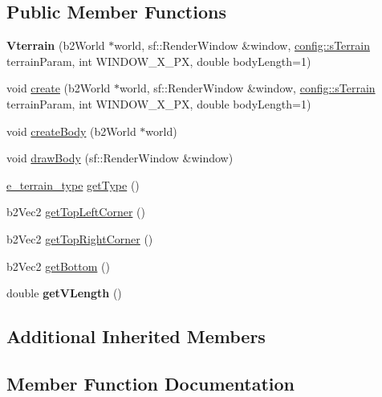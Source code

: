 \subsection*{Public Member Functions}
\begin{DoxyCompactItemize}
\item 
\mbox{\label{class_vterrain_aeb026f16403751d73dd640bec2705c39}} 
{\bfseries Vterrain} (b2\+World $\ast$world, sf\+::\+Render\+Window \&window, \mbox{\hyperlink{structconfig_1_1s_terrain}{config\+::s\+Terrain}} terrain\+Param, int W\+I\+N\+D\+O\+W\+\_\+\+X\+\_\+\+PX, double body\+Length=1)
\item 
void \mbox{\hyperlink{class_vterrain_a480ed9dbd18d1806fa68f44857f3cf99}{create}} (b2\+World $\ast$world, sf\+::\+Render\+Window \&window, \mbox{\hyperlink{structconfig_1_1s_terrain}{config\+::s\+Terrain}} terrain\+Param, int W\+I\+N\+D\+O\+W\+\_\+\+X\+\_\+\+PX, double body\+Length=1)
\item 
void \mbox{\hyperlink{class_vterrain_a5c46826f82f94442e3a2fb8f277bfb37}{create\+Body}} (b2\+World $\ast$world)
\item 
void \mbox{\hyperlink{class_vterrain_a4be34646206e14fe5f5aa3d39761e3fe}{draw\+Body}} (sf\+::\+Render\+Window \&window)
\item 
\mbox{\hyperlink{_terrain_8h_a6d0b7e83bb7325270c1162bece970fd8}{e\+\_\+terrain\+\_\+type}} \mbox{\hyperlink{class_vterrain_abf5de57e84f4aac4f7cdb5c4f3e37b6a}{get\+Type}} ()
\item 
b2\+Vec2 \mbox{\hyperlink{class_vterrain_a2a6ee2632c67ebe63871e7954bb199b1}{get\+Top\+Left\+Corner}} ()
\item 
b2\+Vec2 \mbox{\hyperlink{class_vterrain_a27258a597b11a9cb78bd7e537fb037c4}{get\+Top\+Right\+Corner}} ()
\item 
b2\+Vec2 \mbox{\hyperlink{class_vterrain_a970e49a3753e1c4bc4424b2602c25f85}{get\+Bottom}} ()
\item 
\mbox{\label{class_vterrain_a6de7cc48b17c40723df8b986d19ccc00}} 
double {\bfseries get\+V\+Length} ()
\end{DoxyCompactItemize}
\subsection*{Additional Inherited Members}


\subsection{Member Function Documentation}
\mbox{\label{class_vterrain_a480ed9dbd18d1806fa68f44857f3cf99}} 
